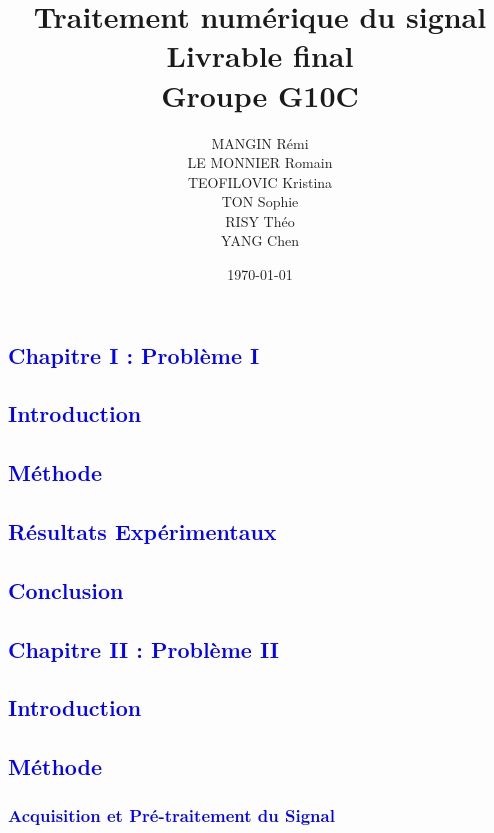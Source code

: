 \documentclass{article}
\title{Traitement numérique du signal \\ \vspace{5mm} Livrable final \\ \vspace{3mm} Groupe G10C }
\author{MANGIN Rémi \\
LE MONNIER Romain \\
TEOFILOVIC Kristina \\
TON Sophie \\
RISY Théo \\
YANG Chen}
\date{\today}
\begin{document}
\maketitle

\newpage
\tableofcontents
\newpage

\newpage
\textcolor{blue}{\section{Chapitre I : Problème I}}
\textcolor{blue}{\subsection{Introduction}}

\textcolor{blue}{\subsection{Méthode}}
\textcolor{blue}{\subsection{Résultats Expérimentaux}}

\textcolor{blue}{\subsection{Conclusion}}

\textcolor{blue}{\section{Chapitre II : Problème II}}
\textcolor{blue}{\subsection{Introduction}}

\textcolor{blue}{\subsection{Méthode}}

\textcolor{blue}{\subsubsection{Acquisition et Pré-traitement du Signal}}
\end{document}
